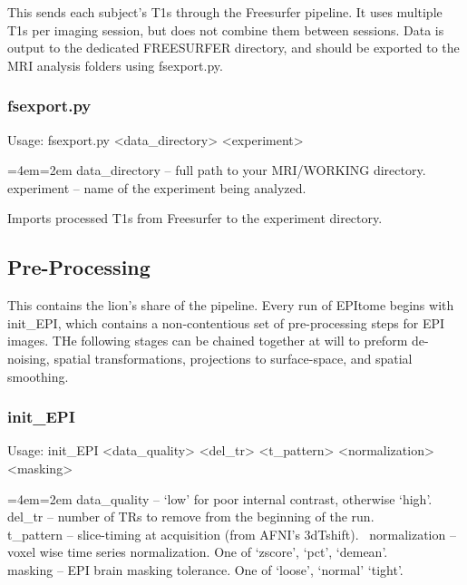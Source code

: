 \documentclass[final,titlepage,letterpaper,oneside,12pt]{article}
\renewcommand{\texttt}[2][BrickRed]{\textcolor{#1}{\ttfamily #2}}%
\newenvironment{blockquote}{%
  \par%
  \medskip
  \leftskip=4em\rightskip=2em%
  \noindent\ignorespaces}{%
  \par\medskip}
\begin{document}
\noindent This sends each subject's T1s through the Freesurfer pipeline. It uses multiple T1s per imaging session, but does not combine them between sessions. Data is output to the dedicated FREESURFER directory, and should be exported to the MRI analysis folders using \texttt{fsexport.py}.

\subsubsection{fsexport.py}
Usage: \texttt{fsexport.py <data\_directory> <experiment>}

\begin{blockquote}
data\_directory -- full path to your MRI/WORKING directory. \\
experiment -- name of the experiment being analyzed. \
\end{blockquote}

\noindent Imports processed T1s from Freesurfer to the experiment directory.

\subsection{Pre-Processing}

This contains the lion's share of the pipeline. Every run of EPItome begins with \texttt{init\_EPI}, which contains a non-contentious set of pre-processing steps for EPI images. THe following stages can be chained together at will to preform de-noising, spatial transformations, projections to surface-space, and spatial smoothing.

\subsubsection{init\_EPI}
Usage: \texttt{init\_EPI <data\_quality> <del\_tr> <t\_pattern> <normalization> <masking>}

\begin{blockquote}
data\_quality -- `low' for poor internal contrast, otherwise `high'. \\
del\_tr -- number of TRs to remove from the beginning of the run. \\
t\_pattern -- slice-timing at acquisition (from AFNI's 3dTshift). \
normalization -- voxel wise time series normalization. One of `zscore', `pct', `demean'. \\
masking -- EPI brain masking tolerance. One of `loose', `normal' `tight'. \
\end{blockquote}
\end{document}
